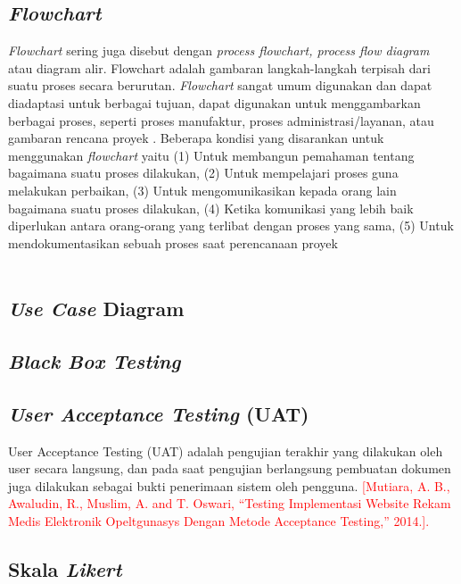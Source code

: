 \begin{flushleft}
\begin{justify}
        \subsection{\textit{Flowchart}}
        \textit{Flowchart} sering juga disebut dengan \textit{process flowchart, process flow diagram} atau diagram alir. Flowchart adalah gambaran langkah-langkah terpisah dari suatu proses secara berurutan. 
        \textit{Flowchart} sangat umum digunakan dan dapat diadaptasi untuk berbagai tujuan, dapat digunakan untuk menggambarkan berbagai proses, seperti proses manufaktur, proses administrasi/layanan, atau gambaran rencana proyek \cite{Flowchart}.
        Beberapa kondisi yang disarankan untuk menggunakan \textit{flowchart} yaitu 
        (1) Untuk membangun pemahaman tentang bagaimana suatu proses dilakukan,
        (2) Untuk mempelajari proses guna melakukan perbaikan,
        (3) Untuk mengomunikasikan kepada orang lain bagaimana suatu proses dilakukan,
        (4) Ketika komunikasi yang lebih baik diperlukan antara orang-orang yang terlibat dengan proses yang sama,
        (5) Untuk mendokumentasikan sebuah proses saat perencanaan proyek
        \\\\

        \subsection{\textit{Use Case} Diagram}

        \subsection{\textit{Black Box Testing}}

        \subsection{\textit{User Acceptance Testing} (UAT)}
        \noindent User Acceptance Testing (UAT) adalah pengujian terakhir yang dilakukan oleh user secara langsung, dan pada saat pengujian berlangsung pembuatan dokumen juga dilakukan sebagai bukti penerimaan sistem oleh pengguna. 
        \textcolor{red}{[Mutiara, A. B., Awaludin, R., Muslim, A. and T. Oswari, “Testing Implementasi Website Rekam Medis Elektronik Opeltgunasys Dengan Metode Acceptance Testing,” 2014.].
        }
        

        \subsection{Skala \textit{Likert}}

    \end{justify}



\end{flushleft}



\newpage